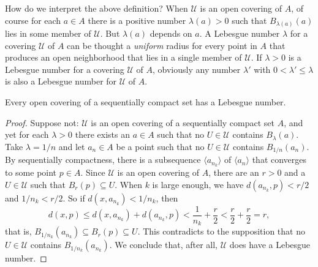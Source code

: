 How do we interpret the above definition?
When $\mathcal{U}$ is an open covering of $A$, of course for each $a \in A$ there is a positive number $\lambda(a) > 0$ such that $B_{\lambda(a)}(a)$ lies in some member of $\mathcal{U}$.
But $\lambda(a)$ depends on $a$.
A Lebesgue number $\lambda$ for a covering $\mathcal{U}$ of $A$ can be thought a \textit{uniform} radius for every point in $A$ that produces an open neighborhood that lies in a single member of $\mathcal{U}$.
If $\lambda > 0$ is a Lebesgue number for a covering $\mathcal{U}$ of $A$, obviously any number $\lambda'$ with $0 < \lambda' \leqslant \lambda$ is also a Lebesgue number for $\mathcal{U}$ of $A$.

\begin{lem}
  \label{lem:lebesgue}
  Every open covering of a sequentially compact set has a Lebesgue number.
\end{lem}

\begin{proof}
  Suppose not: $\mathcal{U}$ is an open covering of a sequentially compact set $A$, and yet for each $\lambda > 0$ there exists an $a \in A$ such that no $U \in \mathcal{U}$ contains $B_\lambda(a)$.
  Take $\lambda = 1/n$ and let $a_n \in A$ be a point such that no $U \in \mathcal{U}$ contains $B_{1/n}(a_n)$.
  By sequentially compactness, there is a subsequence $\langle a_{n_k} \rangle$ of $\langle a_n \rangle$ that converges to some point $p \in A$.
  Since $\mathcal{U}$ is an open covering of $A$, there are an $r > 0$ and a $U \in \mathcal{U}$ such that $B_r(p) \subseteq U$.
  When $k$ is large enough, we have $d(a_{n_k}, p) < r/2$ and $1/n_k < r/2$.
  So if $d(x, a_{n_k}) < 1/n_k$, then
  \[
    d(x,p) \leqslant d(x,a_{n_k}) + d(a_{n_k},p) < \frac{1}{n_k} + \frac{r}{2} < \frac{r}{2} + \frac{r}{2} = r,
  \]
  that is, $B_{1/n_k}(a_{n_k}) \subseteq B_r(p) \subseteq U$.
  This contradicts to the supposition that no $U \in \mathcal{U}$ contains $B_{1/n_k}(a_{n_k})$.
  We conclude that, after all, $\mathcal{U}$ does have a Lebesgue number.
\end{proof}

